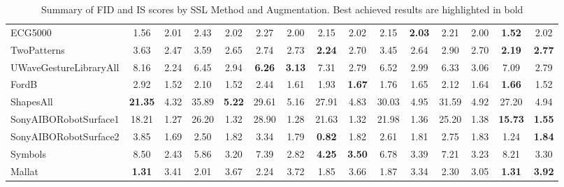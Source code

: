 \documentclass[../../thesis.tex]{subfiles}
\begin{document}
\begin{table}[H]
\begin{adjustbox}{width=\textwidth}
\begin{tabular}{lcc|cc|cc|cc|cc|cc|cc}
        ECG5000                 & 1.56 & 2.01 & 2.43 & 2.02 & 2.27 & 2.00 & 2.15 & 2.02 & 2.15 & \textbf{2.03} & 2.21 & 2.00 & \textbf{1.52} & 2.02 \\
        TwoPatterns             & 3.63 & 2.47 & 3.59 & 2.65 & 2.74 & 2.73 & \textbf{2.24} & 2.70 & 3.45 & 2.64 & 2.90 & 2.70 & \textbf{2.19} & \textbf{2.77} \\
        UWaveGestureLibraryAll  & 8.16 & 2.24 & 6.45 & 2.94 & \textbf{6.26} & \textbf{3.13} & 7.31 & 2.79 & 6.52 & 2.99 & 6.33 & 3.06 & 7.09 & 2.79 \\
        FordB                   & 2.92 & 1.52 & 2.10 & 1.52 & 2.44 & 1.61 & 1.93 & \textbf{1.67} & 1.76 & 1.65  & 2.12 & 1.64 & \textbf{1.66} & 1.52 \\
        ShapesAll               & \textbf{21.35} & 4.32 & 35.89 & \textbf{5.22} & 29.61 & 5.16 & 27.91 & 4.83 & 30.03 & 4.95 & 31.59 & 4.92 & 27.20 & 4.94 \\
        SonyAIBORobotSurface1   & 18.21 & 1.27 & 26.20 & 1.32 & 28.90 & 1.28 & 21.63 & 1.32 & 21.98 & 1.36 & 25.20 & 1.38 & \textbf{15.73} & \textbf{1.55} \\
        SonyAIBORobotSurface2   & 3.85 & 1.69 & 2.50 & 1.82 & 3.34 & 1.79 & \textbf{0.82} & 1.82 & 2.61 & 1.81 & 2.75 & 1.83 & 1.24 & \textbf{1.84} \\
        Symbols                  & 8.50 & 2.43 & 5.86 & 3.20 & 7.39 & 2.82 & \textbf{4.25} & \textbf{3.50} & 6.78 & 3.39 & 7.21 & 3.23 & 8.21 & 3.30 \\
        Mallat                   & \textbf{1.31} & 3.41 & 2.01 & 3.67 & 2.24 & 3.72 & 1.85 & 3.66 & 1.87 & 3.34 & 2.30 & 3.05 & \textbf{1.31} & \textbf{3.92} \\
        \bottomrule
    \end{tabular}
    \end{adjustbox}
    \caption{Summary of FID and IS scores by SSL Method and Augmentation. Best achieved results are highlighted in bold}
    \label{tab:FID_IS_best}
\end{table}
\end{document}
